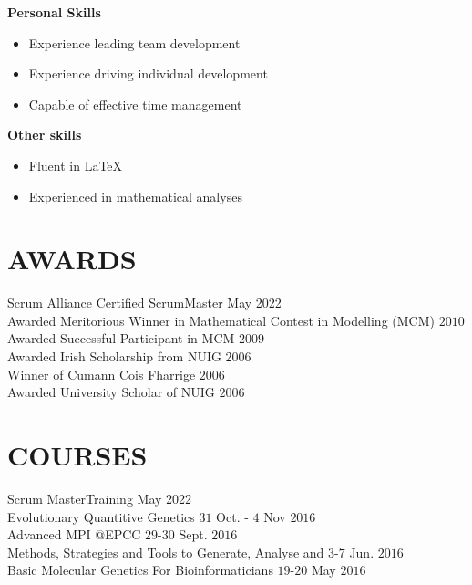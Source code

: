 \documentclass[margin, 10pt]{res} %
\begin{document}
\begin{resume}
{\bf Personal Skills}
\begin{itemize} \itemsep -2pt
 \item Experience leading team development
 \item Experience driving individual development
 \item Capable of effective time management
\end{itemize}

{\bf Other skills}
\begin{itemize} \itemsep -2pt
\item Fluent in LaTeX
\item Experienced in mathematical analyses
\end{itemize}

\section{AWARDS}
Scrum Alliance Certified ScrumMaster \hfill May 2022 \\
Awarded Meritorious Winner in Mathematical Contest in Modelling (MCM) \hfill $2010$ \\
Awarded Successful Participant in MCM \hfill  $2009$ \\
Awarded Irish Scholarship from NUIG \hfill $2006$ \\
Winner of Cumann Cois Fharrige \hfill $2006$ \\
Awarded University Scholar of NUIG \hfill $2006$

\section{COURSES}
Scrum MasterTraining \hfill May 2022 \\
Evolutionary Quantitive Genetics \hfill $31$ Oct. - $4$ Nov $2016$ \\
Advanced MPI @EPCC \hfill $29$-$30$ Sept. $2016$ \\
Methods, Strategies and Tools to Generate, Analyse and  \hfill  $3$-$7$ Jun. $2016$ \\
Basic Molecular Genetics For Bioinformaticians   \hfill $19$-$20$ May $2016$\\





\end{resume}
\end{document}
